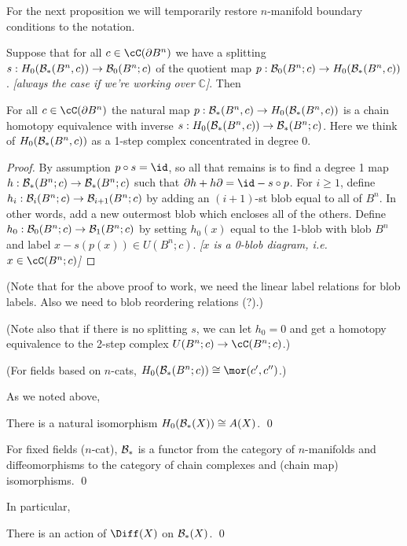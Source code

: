 \documentclass[11pt,leqno]{article}
\def\bc{{\cal B}}
\def\c{\mathbb{C}}
\def\bd{\partial}
\def\nn#1{{{\it \small [#1]}}}
\begin{document}
For the next proposition we will temporarily restore $n$-manifold boundary
conditions to the notation.

Suppose that for all $c \in \cC(\bd B^n)$ 
we have a splitting $s: H_0(\bc_*(B^n, c)) \to \bc_0(B^n; c)$ 
of the quotient map
$p: \bc_0(B^n; c) \to H_0(\bc_*(B^n, c))$.
\nn{always the case if we're working over $\c$}.
Then
\begin{prop} \label{bcontract}
For all $c \in \cC(\bd B^n)$ the natural map $p: \bc_*(B^n, c) \to H_0(\bc_*(B^n, c))$
is a chain homotopy equivalence
with inverse $s: H_0(\bc_*(B^n, c)) \to \bc_*(B^n; c)$.
Here we think of $H_0(\bc_*(B^n, c))$ as a 1-step complex concentrated in degree 0.
\end{prop}
\begin{proof}
By assumption $p\circ s = \id$, so all that remains is to find a degree 1 map
$h : \bc_*(B^n; c) \to \bc_*(B^n; c)$ such that $\bd h + h\bd = \id - s \circ p$.
For $i \ge 1$, define $h_i : \bc_i(B^n; c) \to \bc_{i+1}(B^n; c)$ by adding
an $(i{+}1)$-st blob equal to all of $B^n$.
In other words, add a new outermost blob which encloses all of the others.
Define $h_0 : \bc_0(B^n; c) \to \bc_1(B^n; c)$ by setting $h_0(x)$ equal to
the 1-blob with blob $B^n$ and label $x - s(p(x)) \in U(B^n; c)$.
\nn{$x$ is a 0-blob diagram, i.e. $x \in \cC(B^n; c)$}
\end{proof}

(Note that for the above proof to work, we need the linear label relations 
for blob labels.
Also we need to blob reordering relations (?).)

(Note also that if there is no splitting $s$, we can let $h_0 = 0$ and get a homotopy
equivalence to the 2-step complex $U(B^n; c) \to \cC(B^n; c)$.)

(For fields based on $n$-cats, $H_0(\bc_*(B^n; c)) \cong \mor(c', c'')$.)

\medskip

As we noted above,
\begin{prop}
There is a natural isomorphism $H_0(\bc_*(X)) \cong A(X)$.
\qed
\end{prop}


\begin{prop}
For fixed fields ($n$-cat), $\bc_*$ is a functor from the category
of $n$-manifolds and diffeomorphisms to the category of chain complexes and 
(chain map) isomorphisms.
\qed
\end{prop}


In particular,
\begin{prop}  \label{diff0prop}
There is an action of $\Diff(X)$ on $\bc_*(X)$.
\qed
\end{prop}
\end{document}
